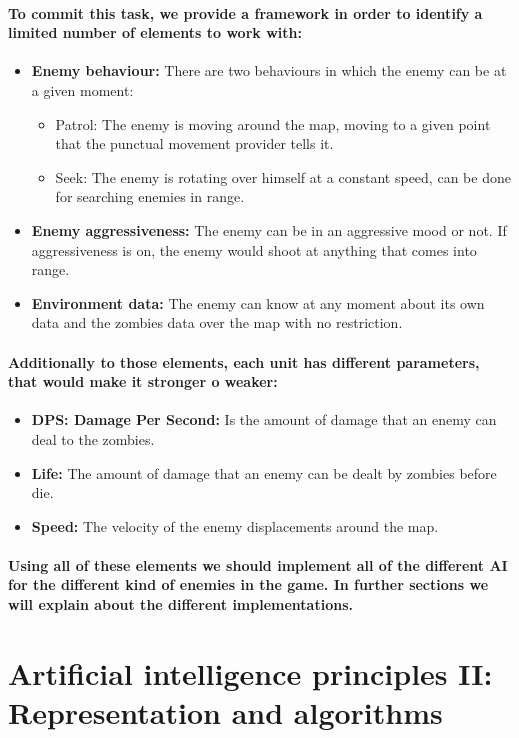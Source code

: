 \documentclass[a4paper,10pt]{article}
\newcommand{\p}[1]{\paragraph{\indent\textnormal{#1}}}
\begin{document}
    \p{To commit this task, we provide a framework in order to identify a limited number of elements to work with:}

    \begin{itemize}
     \item \textbf{Enemy behaviour:} There are two behaviours in which the enemy can be at a given moment:
	 \begin{itemize}
	    \item Patrol: The enemy is moving around the map, moving to a given point that the punctual movement provider tells it.
	    \item Seek: The enemy is rotating over himself at a constant speed, can be done for searching enemies in range.
	  \end{itemize}

     \item \textbf{Enemy aggressiveness:} The enemy can be in an aggressive mood or not. If aggressiveness is on, the enemy would shoot at anything that comes into range.
     \item \textbf{Environment data:} The enemy can know at any moment about its own data and the zombies data over the map with no restriction.
    \end{itemize}

    \p{Additionally to those elements, each unit has different parameters, that would make it stronger o weaker:}

      \begin{itemize}
       \item \textbf{DPS: Damage Per Second:} Is the amount of damage that an enemy can deal to the zombies.
       \item \textbf{Life:} The amount of damage that an enemy can be dealt by zombies before die.
       \item \textbf{Speed:} The velocity of the enemy displacements around the map.
      \end{itemize}

    \p{Using all of these elements we should implement all of the different AI for the different kind of enemies in the game. In further sections we will explain about the different implementations.}



  \newpage
\section{Artificial intelligence principles II: Representation and algorithms}
\end{document}
